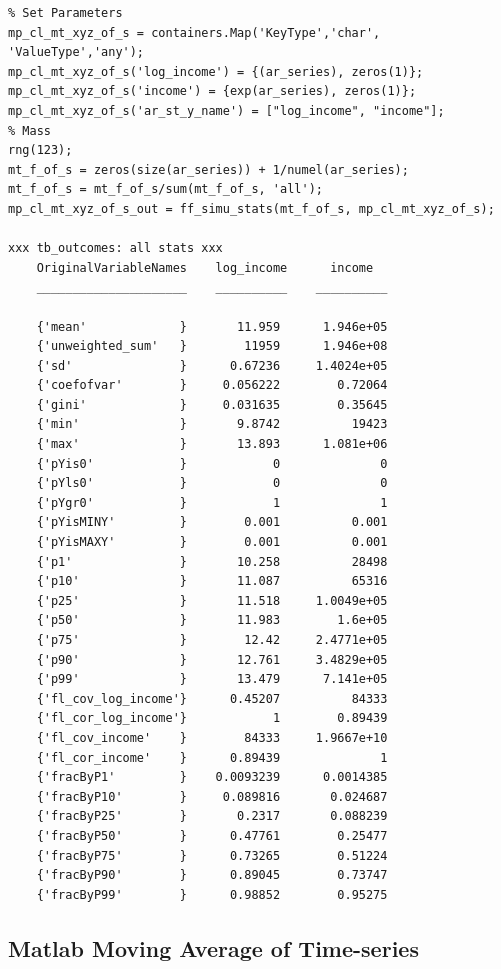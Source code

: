 \documentclass[
]{book}
\begin{document}
\begin{verbatim}
% Set Parameters
mp_cl_mt_xyz_of_s = containers.Map('KeyType','char', 'ValueType','any');
mp_cl_mt_xyz_of_s('log_income') = {(ar_series), zeros(1)};
mp_cl_mt_xyz_of_s('income') = {exp(ar_series), zeros(1)};
mp_cl_mt_xyz_of_s('ar_st_y_name') = ["log_income", "income"];
% Mass
rng(123);
mt_f_of_s = zeros(size(ar_series)) + 1/numel(ar_series);
mt_f_of_s = mt_f_of_s/sum(mt_f_of_s, 'all');
mp_cl_mt_xyz_of_s_out = ff_simu_stats(mt_f_of_s, mp_cl_mt_xyz_of_s);

xxx tb_outcomes: all stats xxx
    OriginalVariableNames    log_income      income  
    _____________________    __________    __________

    {'mean'             }       11.959      1.946e+05
    {'unweighted_sum'   }        11959      1.946e+08
    {'sd'               }      0.67236     1.4024e+05
    {'coefofvar'        }     0.056222        0.72064
    {'gini'             }     0.031635        0.35645
    {'min'              }       9.8742          19423
    {'max'              }       13.893      1.081e+06
    {'pYis0'            }            0              0
    {'pYls0'            }            0              0
    {'pYgr0'            }            1              1
    {'pYisMINY'         }        0.001          0.001
    {'pYisMAXY'         }        0.001          0.001
    {'p1'               }       10.258          28498
    {'p10'              }       11.087          65316
    {'p25'              }       11.518     1.0049e+05
    {'p50'              }       11.983        1.6e+05
    {'p75'              }        12.42     2.4771e+05
    {'p90'              }       12.761     3.4829e+05
    {'p99'              }       13.479      7.141e+05
    {'fl_cov_log_income'}      0.45207          84333
    {'fl_cor_log_income'}            1        0.89439
    {'fl_cov_income'    }        84333     1.9667e+10
    {'fl_cor_income'    }      0.89439              1
    {'fracByP1'         }    0.0093239      0.0014385
    {'fracByP10'        }     0.089816       0.024687
    {'fracByP25'        }       0.2317       0.088239
    {'fracByP50'        }      0.47761        0.25477
    {'fracByP75'        }      0.73265        0.51224
    {'fracByP90'        }      0.89045        0.73747
    {'fracByP99'        }      0.98852        0.95275
\end{verbatim}

\hypertarget{matlab-moving-average-of-time-series}{%
\subsection{Matlab Moving Average of Time-series}\label{matlab-moving-average-of-time-series}}
\end{document}
